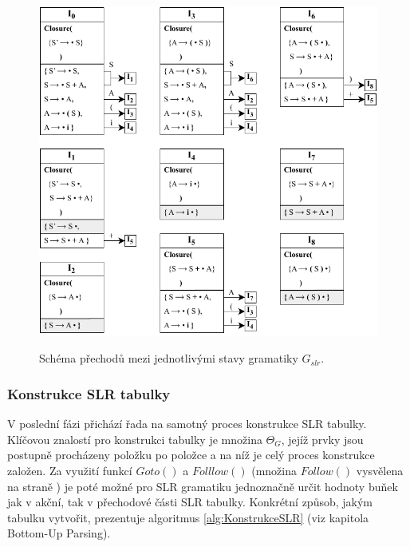 \begin{priklad}
  \begin{figure}[h]\centering
    \centering
    \includegraphics[scale=0.96]{obrazky/ThetaGPriklad.pdf}\\[1pt]
    \caption{Schéma přechodů mezi jednotlivými stavy gramatiky $G_{slr}$.}
    \label{obrThetaG}
  \end{figure}
\end{priklad}

\subsubsection{Konstrukce SLR tabulky}
V poslední fázi přichází řada na samotný proces konstrukce SLR tabulky. Klíčovou znalostí pro konstrukci tabulky je množina $\Theta_G$, jejíž prvky jsou postupně
procházeny položku po položce a
na níž je celý proces konstrukce založen. Za využití funkcí $Goto()$ a $Folllow()$ (množina $Follow()$ vysvělena na straně \pageref{def:Follow}) je poté možné pro SLR gramatiku
jednoznačně určit hodnoty buňek jak v akční, tak v přechodové části SLR tabulky.
Konkrétní způsob, jakým tabulku vytvořit, prezentuje algoritmus \ref{alg:KonstrukceSLR} (viz \cite{VYPa:2022} kapitola Bottom-Up Parsing).

